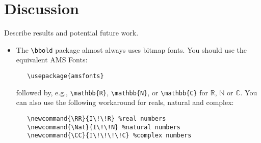 \documentclass{article}
\begin{document}
\section{Discussion}
\label{discuss}

Describe results and potential future work.

\begin{itemize}

\item The \verb+\bbold+ package almost always uses bitmap fonts.  You
  should use the equivalent AMS Fonts:
\begin{verbatim}
   \usepackage{amsfonts}
\end{verbatim}
followed by, e.g., \verb+\mathbb{R}+, \verb+\mathbb{N}+, or
\verb+\mathbb{C}+ for $\mathbb{R}$, $\mathbb{N}$ or $\mathbb{C}$.  You
can also use the following workaround for reals, natural and complex:
\begin{verbatim}
   \newcommand{\RR}{I\!\!R} %real numbers
   \newcommand{\Nat}{I\!\!N} %natural numbers
   \newcommand{\CC}{I\!\!\!\!C} %complex numbers
\end{verbatim}

\end{itemize}

\cite{spectral}



\end{document}
